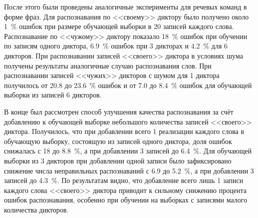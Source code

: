 После этого были проведены аналогичные эксперименты для речевых команд в форме фраз.
Для распознавания по <<своему>> диктору было получено около 1~\% ошибок при размере обучающей выборки в 20 записей каждого слова.
Распознавание по <<чужому>> диктору показало 18~\% ошибок при обучении по записям одного диктора, 6.9~\% ошибок при 3 дикторах и 4.2~\% для 6 дикторов.
При распознавании записей <<своего>> диктора в условиях шума получены результаты аналогичные случаю распознавания слов.
При распознавании записей <<чужих>> дикторов с шумом для 1 диктора получилось от 20.8 до 23.6~\% ошибок и от 7.0 до 8.4~\% ошибок для обучающей выборки из записей 6 дикторов.

В конце был рассмотрен способ улучшения качества распознавания за счёт добавлению к обучающей выборке небольшого количества записей <<своего>> диктора.
Получилось, что при добавлении всего 1 реализации каждого слова в обучающую выборку, состоящую из записей одного диктора, доля ошибок снижалась с 18 до 8.8~\%, а при добавлении 3 записей до 6.4~\%.
Для обучающей выборки из 3 дикторов при добавлении одной записи было зафиксировано снижение числа неправильных распознаваний с 6.9 до 5.2~\%, а при добавлении 3 записей до 4.3~\%.
По результатам видно, что добавление всего лишь 1 записи каждого слова <<своего>> диктора приводит к сильному снижению процента ошибок распознавания, особенно при обучении на выборках с записями малого количества дикторов.


\clearpage